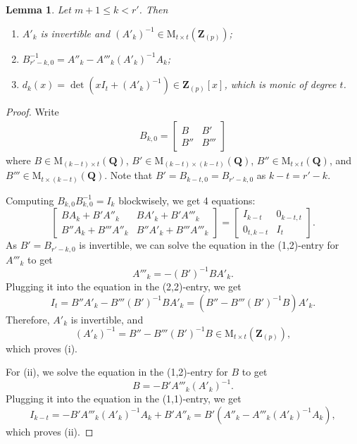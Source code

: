 \documentclass[11pt]{amsart}
\theoremstyle{definition}
\numberwithin{equation}{subsection}
\theoremstyle{plain}
\theoremstyle{plain}
\theoremstyle{plain}
\theoremstyle{plain}
\theoremstyle{plain}
\theoremstyle{plain}
\theoremstyle{plain}
\theoremstyle{plain}
\theoremstyle{plain}
\newtheorem{lemm}[equation]{Lemma}
\theoremstyle{plain}
\theoremstyle{plain}
\theoremstyle{plain}
\theoremstyle{definition}
\theoremstyle{definition}
\theoremstyle{definition}
\theoremstyle{remark}
\renewcommand{\(}{\textup{(}}
\renewcommand{\)}{\textup{)}}
\newcommand{\M}{\mathrm{M}}
\newcommand{\Q}{\mathbf{Q}}
\newcommand{\Z}{\mathbf{Z}}
\begin{document}
\begin{lemm}\label{lemma-QAinv}
Let $m+1\leq k<r'$. Then
    \begin{enumerate}[leftmargin=*]
      \item $A'_k$ is invertible and $(A'_k)^{-1}\in\M_{t\times t}(\Z_{(p)})$;
      \item $B_{r'-k,0}^{-1}=A''_k-A'''_k(A'_k)^{-1}A_k$;
      \item $d_k(x)=\det(xI_t+(A'_k)^{-1})\in \Z_{(p)}[x]$, which is monic of degree $t$.
    \end{enumerate}
\end{lemm}

\begin{proof}
Write
    \begin{align*}
        B_{k,0}=
        \begin{bmatrix}
            B & B' \\
            B'' & B'''
        \end{bmatrix}
    \end{align*}
where $B\in\M_{(k-t)\times t}(\Q)$, $B'\in\M_{(k-t)\times(k-t)}(\Q)$, $B''\in\M_{t\times t}(\Q)$, and $B'''\in\M_{t\times (k-t)}(\Q)$. Note that $B'=B_{k-t,0}=B_{r'-k,0}$ as $k-t=r'-k$.


Computing $B_{k,0}B_{k,0}^{-1}=I_k$ blockwisely, we get 4 equations:
\begin{equation*}
    \begin{bmatrix}
        BA_k+B'A''_k & BA'_k+B'A'''_k\\
        B''A_k+B'''A''_k & B''A'_k+B'''A'''_k
    \end{bmatrix}
    =
          \begin{bmatrix}
        I_{k-t} & 0_{k-t,t}\\
        0_{t,k-t} & I_t
    \end{bmatrix}.
\end{equation*}
As $B'=B_{r'-k,0}$ is invertible, we can solve the equation in the (1,2)-entry for $A'''_k$ to get
    $$A'''_k=-(B')^{-1}B A'_k.$$
Plugging it into the equation in the (2,2)-entry, we get
$$I_t=B''A'_k-B'''(B')^{-1}BA'_k=(B''-B'''(B')^{-1}B)A'_k.$$
Therefore, $A'_k$ is invertible, and
$$
(A'_k)^{-1}=B''-B'''(B')^{-1}B \in\M_{t\times t}(\Z_{(p)}),$$
which proves (i).

For (ii), we solve the equation in the (1,2)-entry for $B$ to get
$$B=-B'A'''_k(A'_k)^{-1}.$$
Plugging it into the equation in the (1,1)-entry, we get
$$I_{k-t}=-B'A'''_k(A'_k)^{-1}A_k+B'A''_k=B'(A''_k-A'''_k(A'_k)^{-1}A_k),$$
which proves (ii).



\end{proof}
\end{document}
